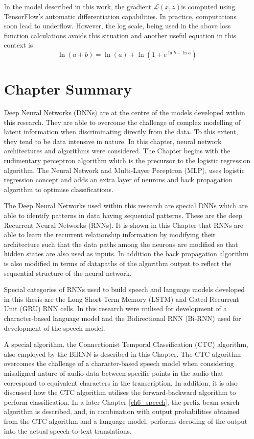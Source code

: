 In the model described in this work, the gradient $\mathcal{L}(x, z)$is computed using TensorFlow's automatic differentiation capabilities. In practice, computations soon lead to underflow.  However, the log scale, being used in the above loss function calculations avoids this situation and another useful equation in this context is
\begin{equation}
\ln(a + b) = \ln(a) + \ln(1 + e^{\ln b - \ln a})
\label{eqn_c3_ctc18}\end{equation}

\section{Chapter Summary}
Deep Neural Networks (DNNs) are at the centre of the models developed within this research.  They are able to overcome the challenge of complex modelling of latent information when discriminating directly from the data.  To this extent, they tend to be data intensive in nature.  In this chapter, neural network architectures and algorithms were considered.  The Chapter begins with the rudimentary perceptron algorithm which is the precursor to the logistic regression algorithm.  The Neural Network and Multi-Layer Peceptron (MLP), uses logistic regression concept and adds an extra layer of neurons and back propagation algorithm to optimise classifications.  

The Deep Neural Networks used within this research are special DNNs which are able to identify patterns in data having sequential patterns.  These are the deep Recurrent Neural Networks (RNNs).  It is shown in this Chapter that RNNs are able to learn the recurrent relationship information by modifying their architecture such that the data paths among the neurons are modified so that hidden states are also used as inputs.  In addition the back propagation algorithm is also modified in terms of datapaths of the algorithm output to reflect the sequential structure of the neural network.

Special categories of RNNs used to build speech and language models developed in this thesis are the Long Short-Term Memory (LSTM) and Gated Recurrent Unit (GRU) RNN cells.  In this research were utilised for development of a character-based language model and the Bidirectional RNN (Bi-RNN) used for development of the speech model.  

A special algorithm, the Connectionist Temporal Classification (CTC) algorithm, also employed by the BiRNN is described in this Chapter.  The CTC algorithm overcomes the challenge of a character-based speech model when considering misaligned nature of audio data between specific points in the audio that correspond to equivalent characters in the transcription.   In addition, it is also discussed how the CTC algorithm utilises the forward-backward algorithm to perform classification.  In a later Chapter \ref{ch6_speech}, the prefix beam search algorithm is described, and, in combination with output probabilities obtained from the CTC algorithm and a language model, performs decoding of the output into the actual speech-to-text translations.
